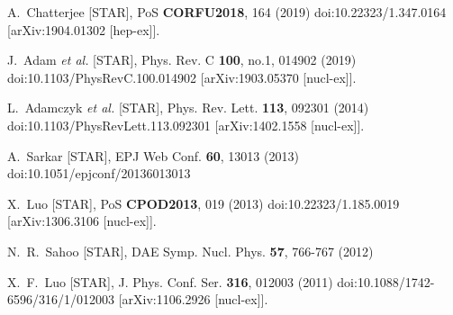 \begin{thebibliography}{99}
A.~Chatterjee [STAR],
PoS \textbf{CORFU2018}, 164 (2019)
doi:10.22323/1.347.0164
[arXiv:1904.01302 [hep-ex]].

J.~Adam \textit{et al.} [STAR],
Phys. Rev. C \textbf{100}, no.1, 014902 (2019)
doi:10.1103/PhysRevC.100.014902
[arXiv:1903.05370 [nucl-ex]].

L.~Adamczyk \textit{et al.} [STAR],
Phys. Rev. Lett. \textbf{113}, 092301 (2014)
doi:10.1103/PhysRevLett.113.092301
[arXiv:1402.1558 [nucl-ex]].

A.~Sarkar [STAR],
EPJ Web Conf. \textbf{60}, 13013 (2013)
doi:10.1051/epjconf/20136013013

X.~Luo [STAR],
PoS \textbf{CPOD2013}, 019 (2013)
doi:10.22323/1.185.0019
[arXiv:1306.3106 [nucl-ex]].

N.~R.~Sahoo [STAR],
DAE Symp. Nucl. Phys. \textbf{57}, 766-767 (2012)

X.~F.~Luo [STAR],
J. Phys. Conf. Ser. \textbf{316}, 012003 (2011)
doi:10.1088/1742-6596/316/1/012003
[arXiv:1106.2926 [nucl-ex]].


\end{thebibliography}
